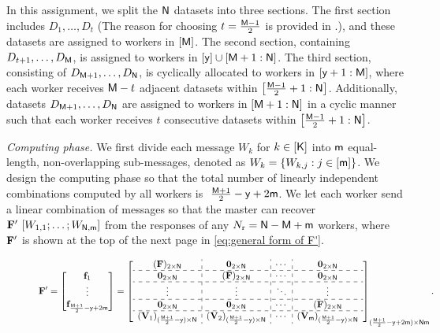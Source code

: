 \documentclass[conference,letterpaper]{IEEEtran}
\begin{document}
In this assignment, we split the ${\sf N}$ datasets into three sections. The first section includes $D_1, \ldots, D_t$ (The reason for choosing $t = \frac{{\sf M} - 1}{2}$ is provided in \cite{wan2022secure}.), and these datasets are assigned to workers in $[{\sf M}]$. The second section, containing $D_{t+1}, \ldots, D_{{\sf M}}$, is assigned to workers in $[{\sf y}] \cup [{\sf M}+1 : {\sf N}]$. The third section, consisting of $D_{{\sf M}+1}, \ldots, D_{{\sf N}}$, is cyclically allocated to workers in $[{\sf y}+1 : {\sf M}]$, where each worker receives ${\sf M} - t$ adjacent datasets within $\left[{\frac{{\sf M} - 1}{2} + 1} : {\sf N} \right]$. Additionally, datasets $D_{{\sf M}+1}, \ldots, D_{{\sf N}}$ are assigned to workers in $[{\sf M}+1 : {\sf N}]$ in a cyclic manner such that each worker receives $t$ consecutive datasets within $\left[{\frac{{\sf M} - 1}{2} + 1} : {\sf N} \right]$.

  {\it Computing phase.}
  We first divide each message $W_k$ for $k \in [{\sf K}]$ into ${\sf m}$ equal-length, non-overlapping sub-messages, denoted as $W_k = \{W_{k,j} : j \in [{\sf m}]\}$.
We design the computing phase so that the total number of linearly independent combinations computed by all workers is $\ \frac {{\sf M} + 1}{2} - {\sf y} + 2{\sf m}$. We let each worker send a linear combination of messages so that the master can recover ${\bf F}' \ [W_{1,1}; \ldots; W_{{\sf N},{\sf m}}]$ from the responses of any $N_{\rm r} = {\sf N} - {\sf M} +{\sf m}$ workers, where \( {\bf F}' \) is shown at the top of the next page in \eqref{eq:general form of F'}.
\begin{figure}
\begin{equation}
 {\bf F}' = \begin{bmatrix}
 \fv_1 \\
 \vdots \\
 \fv_{\frac{\Msf+1}{2}-\ysf+2\msf} 
 \end{bmatrix}
 =
\left[
\begin{array}{c:c:c:c}
 ({\bf F})_{2 \times \Nsf}  & {\bf 0}_{2 \times \Nsf}  & \cdots & {\bf 0}_{2 \times \Nsf}   \\ \hdashline
{\bf 0}_{2 \times \Nsf} &  ({\bf F})_{2 \times \Nsf}   & \cdots & {\bf 0}_{2 \times \Nsf}   \\ \hdashline 
 \vdots   & \vdots  &  \ddots & \vdots \\ \hdashline
 {\bf 0}_{2 \times \Nsf} &   {\bf 0}_{2 \times \Nsf}    & \cdots &  ({\bf F})_{2 \times \Nsf} \\ \hdashline
 ({\bf V}_{1})_{ (\frac{\Msf + 1}{2} - \ysf) \times \Nsf}  &  ({\bf V}_{2})_{ (\frac{\Msf + 1}{2} - \ysf) \times \Nsf}  &   \cdots   &   ({\bf V}_{\msf})_{ (\frac{\Msf + 1}{2} - \ysf) \times \Nsf} 
 \end{array}
\right]_{(\frac{\Msf + 1}{2} - \ysf + 2\msf) \times \Nsf\msf}.
\label{eq:general form of F'}
\end{equation}
\end{figure}
\end{document}
